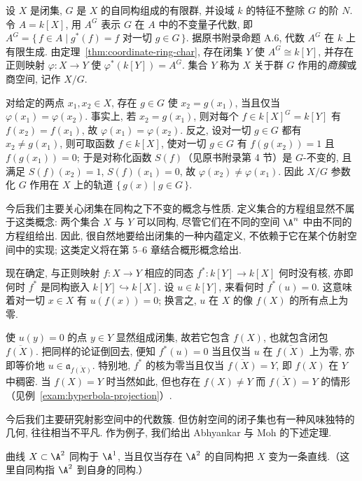 \begin{example}[商簇]\label{exam:quotient}
	设 $X$ 是闭集, $G$ 是 $X$ 的自同构组成的有限群, 并设域 $k$ 的特征不整除 $G$ 的阶 $N$. 令 $A = k[X]$, 用 $A^G$ 表示 $G$ 在 $A$ 中的不变量子代数, 即 $A^G = \{\, f \in A \mid g^*(f) = f \text{ 对一切 } g \in G \,\}$. 据原书附录命题 A.6, 代数 $A^G$ 在 $k$ 上有限生成. 由定理~\ref{thm:coordinate-ring-char}, 存在闭集 $Y$ 使 $A^G \cong k[Y]$, 并存在正则映射 $\varphi: X \to Y$ 使 $\varphi^*(k[Y]) = A^G$. 集合 $Y$ 称为 $X$ 关于群 $G$ 作用的\emph{商簇}或商空间, 记作 $X/G$.

	对给定的两点 $x_1, x_2 \in X$, 存在 $g \in G$ 使 $x_2 = g(x_1)$, 当且仅当 $\varphi(x_1) = \varphi(x_2)$. 事实上, 若 $x_2 = g(x_1)$, 则对每个 $f \in k[X]^G = k[Y]$ 有 $f(x_2) = f(x_1)$, 故 $\varphi(x_1) = \varphi(x_2)$. 反之, 设对一切 $g \in G$ 都有 $x_2 \ne g(x_1)$, 则可取函数 $f \in k[X]$, 使对一切 $g \in G$ 有 $f(g(x_2)) = 1$ 且 $f(g(x_1)) = 0$; 于是对称化函数 $S(f)$（见原书附录第 4 节）是 $G$-不变的, 且满足 $S(f)(x_2) = 1$, $S(f)(x_1) = 0$, 故 $\varphi(x_2) \ne \varphi(x_1)$. 因此 $X/G$ 参数化 $G$ 作用在 $X$ 上的轨道 $\{\, g(x) \mid g \in G \,\}$.
\end{example}

今后我们主要关心闭集在同构之下不变的概念与性质. 定义集合的方程组显然不属于这类概念: 两个集合 $X$ 与 $Y$ 可以同构, 尽管它们在不同的空间 $\A^n$ 中由不同的方程组给出. 因此, 很自然地要给出闭集的一种内蕴定义, 不依赖于它在某个仿射空间中的实现; 这类定义将在第 5--6 章结合概形概念给出.

现在确定, 与正则映射 $f: X \to Y$ 相应的同态 $f^*: k[Y] \to k[X]$ 何时没有核, 亦即何时 $f^*$ 是同构嵌入 $k[Y] \hookrightarrow k[X]$. 设 $u \in k[Y]$, 来看何时 $f^*(u) = 0$. 这意味着对一切 $x \in X$ 有 $u(f(x)) = 0$; 换言之, $u$ 在 $X$ 的像 $f(X)$ 的所有点上为零.

使 $u(y) = 0$ 的点 $y \in Y$ 显然组成闭集, 故若它包含 $f(X)$, 也就包含闭包 $\overline{f(X)}$. 把同样的论证倒回去, 便知 $f^*(u) = 0$ 当且仅当 $u$ 在 $\overline{f(X)}$ 上为零, 亦即等价地 $u \in \mathfrak a_{\overline{f(X)}}$. 特别地, $f^*$ 的核为零当且仅当 $\overline{f(X)} = Y$, 即 $f(X)$ 在 $Y$ 中稠密. 当 $f(X) = Y$ 时当然如此, 但也存在 $f(X) \ne Y$ 而 $\overline{f(X)} = Y$ 的情形（见例~\ref{exam:hyperbola-projection}）.

今后我们主要研究射影空间中的代数簇. 但仿射空间的闭子集也有一种风味独特的几何, 往往相当不平凡. 作为例子, 我们给出 Abhyankar 与 Moh 的下述定理.

\begin{theorem}\label{thm:abhyankar-moh}
	曲线 $X \subset \A^2$ 同构于 $\A^1$, 当且仅当存在 $\A^2$ 的自同构把 $X$ 变为一条直线.（这里自同构指 $\A^2$ 到自身的同构.）
\end{theorem}

